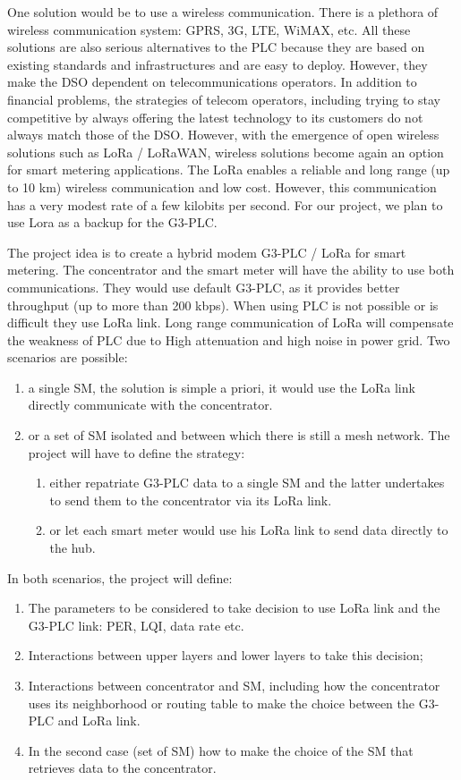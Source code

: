 \documentclass[a4paper,10pt]{article}
\begin{document}
One solution would be to use a wireless communication. There
is a plethora of wireless communication system: GPRS, 3G,
LTE, WiMAX, etc. All these solutions are also serious
alternatives to the PLC because they are based on existing
standards and infrastructures and are easy to
deploy. However, they make the DSO dependent on
telecommunications operators. In addition to financial
problems, the strategies of telecom operators, including
trying to stay competitive by always offering the latest
technology to its customers do not always match those of the
DSO. However, with the emergence of open wireless solutions
such as LoRa / LoRaWAN, wireless solutions become again an
option for smart metering applications. The LoRa enables a
reliable and long range (up to 10 km) wireless communication
and low cost. However, this communication has a very modest
rate of a few kilobits per second. For our project, we plan
to use Lora as a backup for the G3-PLC.

The project idea is to create a hybrid modem G3-PLC / LoRa
for smart metering. The concentrator and the smart meter
will have the ability to use both communications. They would
use default G3-PLC, as it provides better throughput (up to
more than 200 kbps). When using PLC is not possible or is
difficult they use LoRa link. Long range communication of
LoRa will compensate the weakness of PLC due to High
attenuation and high noise in power grid. Two scenarios are
possible:

\begin{enumerate}
  \item a single SM, the solution is simple a priori, it would use the LoRa link directly communicate with the concentrator.
  \item or a set of SM isolated and between which there is still a mesh network. The project will have to define the strategy:
    \begin{enumerate}
      \item either repatriate G3-PLC data to a single SM and the latter undertakes to send them to the concentrator via its LoRa link.
      \item or let each smart meter would use his LoRa link to send data directly to the hub.
    \end{enumerate}
\end{enumerate}

In both scenarios, the project will define:

\begin{enumerate}
\item The parameters to be considered to take decision to use LoRa link and the G3-PLC link: PER, LQI, data rate etc.
\item Interactions between upper layers and lower layers to take this decision;
\item Interactions between concentrator and SM, including how the concentrator uses its neighborhood or routing table to make the choice between the G3-PLC and LoRa link.
\item In the second case (set of SM) how to make the choice of the SM that retrieves data to the concentrator.
\end{enumerate}
\end{document}
